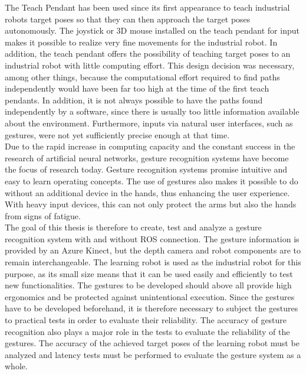 The Teach Pendant has been used since its first appearance to teach industrial robots target poses so that they can then approach the target poses autonomously. The joystick or 3D mouse installed on the teach pendant for input makes it possible to realize very fine movements for the industrial robot. In addition, the teach pendant offers the possibility of teaching target poses to an industrial robot with little computing effort. This design decision was necessary, among other things, because the computational effort required to find paths independently would have been far too high at the time of the first teach pendants. In addition, it is not always possible to have the paths found independently by a software, since there is usually too little information available about the environment. Furthermore, inputs via natural user interfaces, such as gestures, were not yet sufficiently precise enough at that time.\\

Due to the rapid increase in computing capacity and the constant success in the research of artificial neural networks, gesture recognition systems have become the focus of research today. Gesture recognition systems promise intuitive and easy to learn operating concepts. The use of gestures also makes it possible to do without an additional device in the hands, thus enhancing the user experience. With heavy input devices, this can not only protect the arms but also the hands from signs of fatigue.\\

The goal of this thesis is therefore to create, test and analyze a gesture recognition system with and without ROS connection. The gesture information is provided by an Azure Kinect, but the depth camera and robot components are to remain interchangeable. The  learning robot is used as the industrial robot for this purpose, as its small size means that it can be used easily and efficiently to test new functionalities. The gestures to be developed should above all provide high ergonomics and be protected against unintentional execution. Since the gestures have to be developed beforehand, it is therefore necessary to subject the gestures to practical tests in order to evaluate their reliability. The accuracy of gesture recognition also plays a major role in the tests to evaluate the reliability of the gestures. The accuracy of the achieved target poses of the  learning robot must be analyzed and latency tests must be performed to evaluate the gesture system as a whole.
